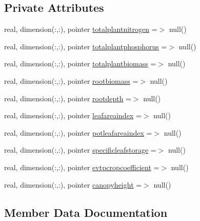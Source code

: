 \subsection*{Private Attributes}
\begin{DoxyCompactItemize}
\item 
real, dimension(\+:,\+:), pointer \mbox{\hyperlink{structmodulevegetation_1_1t__statevariables_acc0b682695f3dde8e47256421c0f7f8b}{totalplantnitrogen}} =$>$ null()
\item 
real, dimension(\+:,\+:), pointer \mbox{\hyperlink{structmodulevegetation_1_1t__statevariables_a0c5d7ec090ba23cf42e713196138b854}{totalplantphosphorus}} =$>$ null()
\item 
real, dimension(\+:,\+:), pointer \mbox{\hyperlink{structmodulevegetation_1_1t__statevariables_a27637717ec8de7c52d34242c959872c8}{totalplantbiomass}} =$>$ null()
\item 
real, dimension(\+:,\+:), pointer \mbox{\hyperlink{structmodulevegetation_1_1t__statevariables_a77a2e32411a083bd2a3b38057b4a3607}{rootbiomass}} =$>$ null()
\item 
real, dimension(\+:,\+:), pointer \mbox{\hyperlink{structmodulevegetation_1_1t__statevariables_a8a3ac4139ebb0ad0387e5f3990d06f98}{rootdepth}} =$>$ null()
\item 
real, dimension(\+:,\+:), pointer \mbox{\hyperlink{structmodulevegetation_1_1t__statevariables_aff09c1b8d5413b9a189e9516850b3835}{leafareaindex}} =$>$ null()
\item 
real, dimension(\+:,\+:), pointer \mbox{\hyperlink{structmodulevegetation_1_1t__statevariables_a333d00fedcfefa207c16dfdc270a6bf3}{potleafareaindex}} =$>$ null()
\item 
real, dimension(\+:,\+:), pointer \mbox{\hyperlink{structmodulevegetation_1_1t__statevariables_a6bcea0d758f49f5af04b4e5a4520623a}{specificleafstorage}} =$>$ null()
\item 
real, dimension(\+:,\+:), pointer \mbox{\hyperlink{structmodulevegetation_1_1t__statevariables_a4bb4b2c0c72b141d2352dcf5464bddb9}{evtpcropcoefficient}} =$>$ null()
\item 
real, dimension(\+:,\+:), pointer \mbox{\hyperlink{structmodulevegetation_1_1t__statevariables_aec081644dae1cc8eb01f43c1ec16ae9f}{canopyheight}} =$>$ null()
\end{DoxyCompactItemize}


\subsection{Member Data Documentation}
\mbox{\label{structmodulevegetation_1_1t__statevariables_aec081644dae1cc8eb01f43c1ec16ae9f}} 
